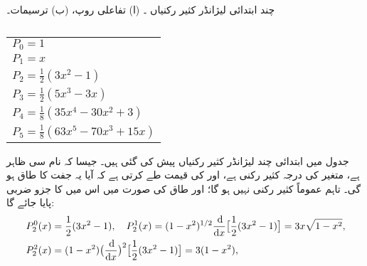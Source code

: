 \begin{table}
\caption{چند ابتدائی لیژانڈر کثیر رکنیاں ۔ (ا) تفاعلی روپ، (ب) ترسیمات۔}
\label{جدول_ابعاد_لیژانڈر_چند_ابتدائی}
\centering
\begin{subtable}{0.45\textwidth}
\centering
\begin{tabular}{l}
$P_0=1$\\[0.25em]
$P_1=x$\\[0.25em]
$P_2=\frac{1}{2}(3x^2-1)$\\[0.25em]
$P_3=\frac{1}{2}(5x^3-3x)$\\[0.25em]
$P_4=\frac{1}{8}(35x^4-30x^2+3)$\\[0.25em]
$P_5=\frac{1}{8}(63x^5-70x^3+15x)$
\end{tabular}
\caption{}
\end{subtable}\hfill
\begin{subtable}{0.45\textwidth}
\centering
{}
\caption{}
\end{subtable}
\end{table}
جدول  میں ابتدائی چند لیژانڈر کثیر رکنیاں پیش کی گئی ہیں۔ جیسا کہ نام سی ظاہر ہے،  متغیر  کی درجہ  کثیر رکنی ہے، اور  کی قیمت طے  کرتی ہے کہ آیا یہ جفت کا طاق ہو گی۔ تاہم    عموماً کثیر رکنی نہیں ہو گا؛ اور طاق  کی صورت میں اس میں  کا جزو ضربی پایا جائے گا:
\begin{align*}
P_{2}^{0}(x)&=\frac{1}{2}(3x^{2}-1), \quad P_{2}^{1}(x)=(1-x^{2})^{1/2}\frac{\dif}{\dif{x}}\big[\frac{1}{2}(3x^{2}-1)\big]=3x\sqrt{1-x^{2}}, \\
P_{2}^{2}(x)&=(1-x^{2})\big(\frac{\dif}{\dif{x}}\big)^{2}\big[\frac{1}{2}(3x^{2}-1)\big]=3(1-x^{2}),
\end{align*}
